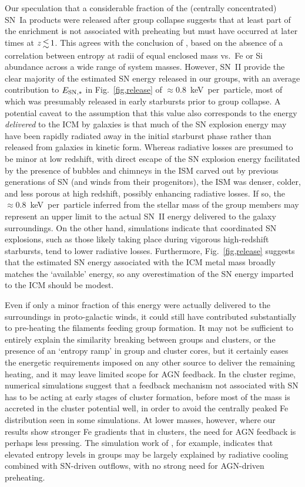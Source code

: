\documentclass[useAMS,usenatbib]{mn2e}
\begin{document}
Our speculation that a considerable fraction of the (centrally
concentrated) SN~Ia products were released after group collapse
suggests that at least part of the enrichment is not associated with
preheating but must have occurred at later times at $z\la 1$. This
agrees with the conclusion of \citet{fino02}, based on the absence of
a correlation between entropy at radii of equal enclosed mass vs.\ Fe
or Si abundance across a wide range of system masses. However, SN~II
provide the clear majority of the estimated SN energy released in our
groups, with an average contribution to $E_{\rm SN,\ast}$ in
Fig.~\ref{fig,release} of $\approx 0.8$~keV~per~particle, most of
which was presumably released in early starbursts prior to group
collapse. A potential caveat to the assumption that this value also
corresponds to the energy {\em delivered} to the ICM by galaxies is
that much of the SN explosion energy may have been rapidly radiated
away in the initial starburst phase rather than released from galaxies
in kinetic form. Whereas radiative losses are presumed to be minor at
low redshift, with direct escape of the SN explosion energy
facilitated by the presence of bubbles and chimneys in the ISM carved
out by previous generations of SN (and winds from their progenitors),
the ISM was denser, colder, and less porous at high redshift, possibly
enhancing radiative losses. If so, the $\approx 0.8$~keV~per~particle
inferred from the stellar mass of the group members may represent an
upper limit to the actual SN~II energy delivered to the galaxy
surroundings. On the other hand, simulations \citep{stri00} indicate
that coordinated SN explosions, such as those likely taking place
during vigorous high-redshift starbursts, tend to lower radiative
losses. Furthermore, Fig.~\ref{fig,release} suggests that the
estimated SN energy associated with the ICM metal mass broadly matches
the `available' energy, so any overestimation of the SN energy
imparted to the ICM should be modest.


Even if only a minor fraction of this energy were actually delivered
to the surroundings in proto-galactic winds, it could still have
contributed substantially to pre-heating the filaments feeding group
formation. It may not be sufficient to entirely explain the similarity
breaking between groups and clusters, or the presence of an `entropy
ramp' in group and cluster cores, but it certainly eases the energetic
requirements imposed on any other source to deliver the remaining
heating, and it may leave limited scope for AGN feedback. In the
cluster regime, numerical simulations \citep{torn04} suggest that a
feedback mechanism not associated with SN has to be acting at early
stages of cluster formation, before most of the mass is accreted in
the cluster potential well, in order to avoid the centrally peaked Fe
distribution seen in some simulations. At lower masses, however, where
our results show stronger Fe gradients that in clusters, the need for
AGN feedback is perhaps less pressing. The simulation work of
\cite{dave08}, for example, indicates that elevated entropy levels in
groups may be largely explained by radiative cooling combined with
SN-driven outflows, with no strong need for AGN-driven preheating.
\end{document}
